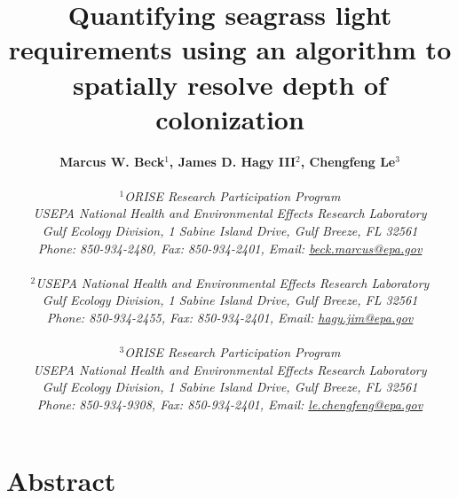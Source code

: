 \documentclass[letterpaper,12pt,oneside]{article}\usepackage[]{graphicx}\usepackage[]{color}
\begin{document}
\raggedbottom
\linenumbers
\raggedright
{}
\setlength{\parindent}{0.5in}
\renewcommand\refname{References \vspace{12pt}}

\begin{singlespace}
\title{{\bf {\Large Quantifying seagrass light requirements using an algorithm to spatially resolve depth of colonization}}}
\author{
  {\bf {\normalsize Marcus W. Beck$^1$, James D. Hagy III$^2$, Chengfeng Le$^3$}}
  \\\\{\textit {\normalsize $^1$ORISE Research Participation Program}}
  \\{\textit {\normalsize USEPA National Health and Environmental Effects Research Laboratory}}
  \\{\textit {\normalsize Gulf Ecology Division, 1 Sabine Island Drive, Gulf Breeze, FL 32561}}
	\\{\textit {\normalsize Phone: 850-934-2480, Fax: 850-934-2401, Email: \href{mailto:beck.marcus@epa.gov}{beck.marcus@epa.gov}}}
  \\\\{\textit {\normalsize $^2$USEPA National Health and Environmental Effects Research Laboratory}}
	\\{\textit {\normalsize Gulf Ecology Division, 1 Sabine Island Drive, Gulf Breeze, FL 32561}}
	\\{\textit {\normalsize Phone: 850-934-2455, Fax: 850-934-2401, Email: \href{mailto:hagy.jim@epa.gov}{hagy.jim@epa.gov}}}
  \\\\{\textit {\normalsize $^3$ORISE Research Participation Program}}
  \\{\textit {\normalsize USEPA National Health and Environmental Effects Research Laboratory}}
  \\{\textit {\normalsize Gulf Ecology Division, 1 Sabine Island Drive, Gulf Breeze, FL 32561}}
  \\{\textit {\normalsize Phone: 850-934-9308, Fax: 850-934-2401, Email: \href{mailto:le.chengfeng@epa.gov}{le.chengfeng@epa.gov}}}
	}
\date{}
\maketitle
\end{singlespace}
\clearpage

\section*{Abstract}
\end{document}

